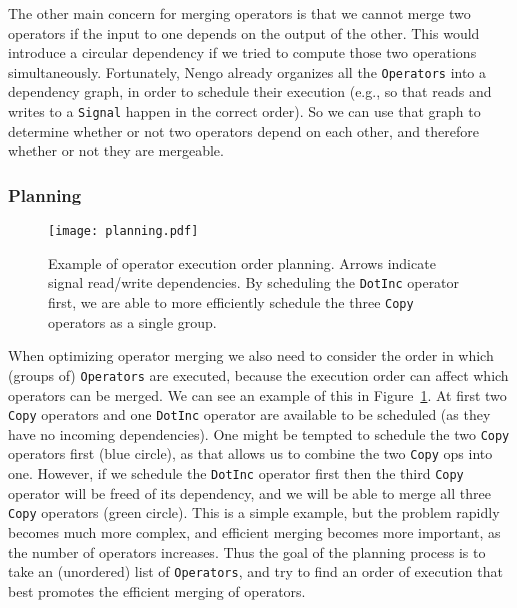 \documentclass{article}
\begin{document}
The other main concern for merging operators is that we cannot merge two operators if the input to one depends on the output of the other.  This would introduce a circular dependency if we tried to compute those two operations simultaneously.  Fortunately, Nengo already organizes all the \texttt{Operators} into a dependency graph, in order to schedule their execution (e.g., so that reads and writes to a \texttt{Signal} happen in the correct order).  So we can use that graph to determine whether or not two operators depend on each other, and therefore whether or not they are mergeable.

\subsubsection{Planning}
\label{sec:planning}

\begin{figure}
\centering
\texttt{[image: planning.pdf]}
\caption{Example of operator execution order planning.  Arrows indicate signal read/write dependencies.  By scheduling the \texttt{DotInc} operator first, we are able to more efficiently schedule the three \texttt{Copy} operators as a single group.}
\label{fig:planning}
\end{figure}

When optimizing operator merging we also need to consider the order in which (groups of) \texttt{Operators} are executed, because the execution order can affect which operators can be merged.  We can see an example of this in Figure~\ref{fig:planning}.  At first two \texttt{Copy} operators and one \texttt{DotInc} operator are available to be scheduled (as they have no incoming dependencies).  One might be tempted to schedule the two \texttt{Copy} operators first (blue circle), as that allows us to combine the two \texttt{Copy} ops into one.  However, if we schedule the \texttt{DotInc} operator first then the third \texttt{Copy} operator will be freed of its dependency, and we will be able to merge all three \texttt{Copy} operators (green circle).  This is a simple example, but the problem rapidly becomes much more complex, and efficient merging becomes more important, as the number of operators increases.  Thus the goal of the planning process is to take an (unordered) list of \texttt{Operators}, and try to find an order of execution that best promotes the efficient merging of operators.
\end{document}
